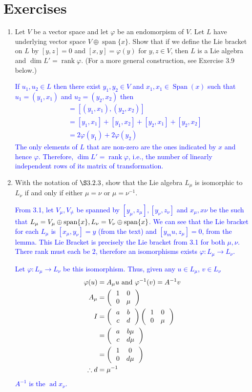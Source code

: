 \documentclass[12pt,a4paper]{report}
\newcommand{\BLUE}[1]{\textcolor{blue}{#1}}
\newcommand{\AD}{\operatorname{ad}}
\begin{document}
\section{Exercises}


\begin{enumerate}[label=3.\arabic*.]

\item Let $V$ be a vector space and let $\varphi$ be an endomorpism of $V$.  Let $L$ have underlying vector space $V \oplus \operatorname{span}\{x\}$.  Show that if we define the Lie bracket on $L$ by $[y,z]=0$ and $[x,y]=\varphi(y)$ for $y,z\in V$, then $L$ is a Lie algebra and $\dim L' = \operatorname{rank} \varphi$.  (For a more general construction, see Exercise 3.9 below.)

\BLUE{If $u_1, u_2 \in L$ then there exist $y_1, y_2 \in V$ and $x_1, x_1 \in \operatorname{Span}({x})$ such that $u_1 = (y_1, x_1)$ and $u_2 = (y_2, x_2)$ then
\begin{align*}
	[u_1, u_2] &= [(y_1, x_1), (y_2, x_2)] \\ &= [y_1, x_1]+[y_1, x_2] + [y_2, x_1] + [y_2, x_2] \\
	&= 2\varphi(y_1)+2\varphi(y_2)
\end{align*}The only elements of $L$ that are non-zero are the ones indicated by $x$ and hence $\varphi$.  Therefore, $\dim L' = \operatorname{rank}\varphi$, i.e., the number of linearly independent rows of its matrix of transformation.
}

\item With the notation of $\S 3.2.3$, show that the Lie algebra $L_\mu$ is isomorphic to $L_\nu$ if and only if either $\mu =\nu$ or $\mu=\nu^{-1}$.

\BLUE{From 3.1, let $V_\mu, V_\ne$ be spanned by $[y_\mu, z_\mu], [y_\nu, z_\nu]$ and $x_\mu, x\nu$ be the such that $L_\mu = V_\mu\oplus \operatorname{span}\{x\},L_\nu = V_\nu\oplus \operatorname{span}\{x\}$.  We can see that the Lie bracket for each $L_\mu$ is $[x_\mu,y_\nu] = y$ (from the text) and $[y_mu, z_\mu] = 0$, from the lemma.  This Lie Bracket is precisely the Lie bracket from 3.1 for both $\mu, \nu$.  There rank must each be 2, therefore an isomorphisms exists $\varphi: L_\mu \to L_\nu$.
}

\BLUE{Let $\varphi: L_\mu \to L_\nu$ be this isomorphism.  Thus, given any $u \in L_\mu$, $v \in L_\nu$
\begin{align*}
	\varphi(u) &= A_\mu u \text{ and } \varphi^{-1}(v) = A^{-1}v \\
	A_\mu &= \left (\,  \begin{array}{c c} 1&0 \\ 0 & \mu \end{array}  \,\right )\\
	I &= \left (\,  \begin{array}{c c} a&b \\ c & d \end{array}  \,\right )\left (\,  \begin{array}{c c} 1&0 \\ 0 & \mu \end{array}  \,\right ) \\
	&= \left (\,  \begin{array}{c c} a&b\mu \\ c & d\mu \end{array}  \,\right )\\
	&= \left (\,  \begin{array}{c c} 1&0 \\ 0 & d\mu \end{array}  \,\right ) \\
	\therefore d &= \mu^{-1}
\end{align*}$A^{-1}$ is the $\AD x_\nu$.
}


\end{enumerate}
\end{document}

